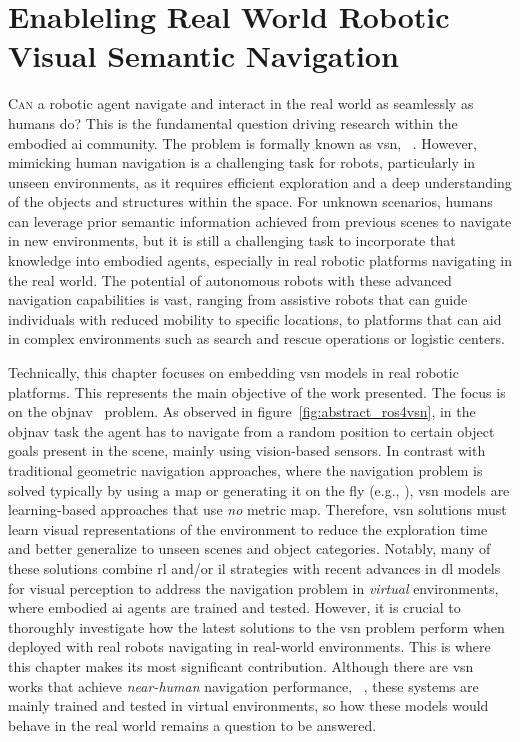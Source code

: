\chapter{Enableling Real World Robotic Visual Semantic Navigation}\label{ch:ros4vsn:-enable-real-world-robotic-visual-semantic-navigation}

\lettrine{\textcolor{accent_color}{C}}{an} a robotic agent navigate and interact in the real world as seamlessly as humans do?
This is the fundamental question driving research within the embodied \acrshort{ai} community.
The problem is formally known as \acrlong{vsn}, \eg~\cite{ramrakhya2023,Cai2024DGMemLV,chang2020}.
However, mimicking human navigation is a challenging task for robots, particularly in unseen environments, as it requires efficient exploration and a deep understanding of the objects and structures within the space.
For unknown scenarios, humans can leverage prior semantic information achieved from previous scenes to navigate in new environments, but it is still a challenging task to incorporate that knowledge into embodied agents, especially in real robotic platforms navigating in the real world.
The potential of autonomous robots with these advanced navigation capabilities is vast, ranging from assistive robots that can guide individuals with reduced mobility to specific locations, to platforms that can aid in complex environments such as search and rescue operations or logistic centers.

Technically, this chapter focuses on embedding \acrshort{vsn} models in real robotic platforms.
This represents the main objective of the work presented.
The focus is on the \acrfull{objnav}~\cite{batra2020} problem.
As observed in figure~\ref{fig:abstract_ros4vsn}, in the \acrshort{objnav} task the agent has to navigate from a random position to certain object goals present in the scene, mainly using vision-based sensors.
In contrast with traditional geometric navigation approaches, where the navigation problem is solved typically by using a map or generating it on the fly (e.g., ), \acrshort{vsn} models are learning-based approaches that use \emph{no} metric map.
Therefore, \acrshort{vsn} solutions must learn visual representations of the environment to reduce the exploration time and better generalize to unseen scenes and object categories.
Notably, many of these solutions combine \acrshort{rl} and/or \acrshort{il} strategies with recent advances in \acrshort{dl} models for visual perception to address the navigation problem in \emph{virtual} environments, where embodied \acrshort{ai} agents are trained and tested.
However, it is crucial to thoroughly investigate how the latest solutions to the \acrshort{vsn} problem perform when deployed with real robots navigating in real-world environments.
This is where this chapter makes its most significant contribution.
Although there are \acrshort{vsn} works that achieve \textit{near-human} navigation performance, \eg~\cite{ramrakhya2023}, these systems are mainly trained and tested in virtual environments, so how these models would behave in the real world remains a question to be answered.

